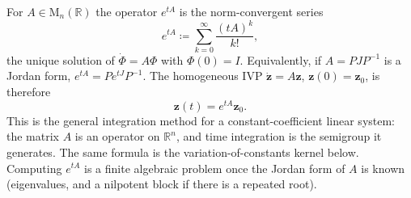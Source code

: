 \documentclass[11pt,a4paper]{article}
\begin{document}
\begin{definition}
\label{def:matexp}
For \(A\in\mathrm{M}_n(\mathbb R)\) the operator \(e^{tA}\) is the norm-convergent series
\[
e^{tA}
\coloneqq
\sum_{k=0}^{\infty}\frac{(tA)^{k}}{k!},
\]
the unique solution of \(\dot\Phi=A\Phi\) with \(\Phi(0)=I\). Equivalently, if \(A=PJP^{-1}\) is a Jordan form, \(e^{tA}=P e^{tJ}P^{-1}\). The homogeneous IVP \(\dot{\mathbf{z}}=A\mathbf{z}\), \(\mathbf{z}(0)=\mathbf{z}_0\), is therefore
\[
\mathbf{z}(t)
=
e^{tA}\mathbf{z}_0.
\]
This is the general integration method for a constant-coefficient linear system: the matrix \(A\) is an operator on \(\mathbb R^n\), and time integration is the semigroup it generates. The same formula is the variation-of-constants kernel below. Computing \(e^{tA}\) is a finite algebraic problem once the Jordan form of \(A\) is known (eigenvalues, and a nilpotent block if there is a repeated root).
\end{definition}
\end{document}
